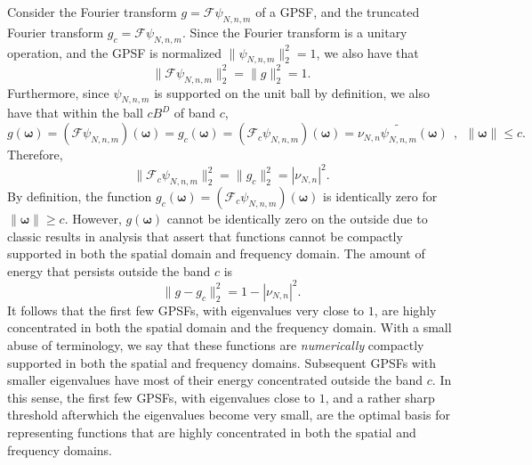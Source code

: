 \documentclass[12pt]{article}
\begin{document}
Consider the Fourier transform $g = \mathcal{F} \psi_{N,n,m}$ of a GPSF,
and the truncated Fourier transform $g_c = \mathcal{F} \psi_{N,n,m}$.
Since the Fourier transform is a unitary operation, and the GPSF is normalized $\|\psi_{N,n,m}\|_2^2=1$,
we also have that 
\begin{equation}
\| \mathcal{F} \psi_{N,n,m} \|_2^2 = \|g\|_2^2=1. 
\end{equation}
Furthermore, since $\psi_{N,n,m}$ is supported on the unit ball by definition, we also have that within the ball $cB^D$ of band $c$, 
\begin{equation}
g({\bm \omega}) = \left( \mathcal{F} \psi_{N,n,m}\right)({\bm \omega}) =  g_c({\bm \omega}) = \left( \mathcal{F}_c \psi_{N,n,m}\right)({\bm \omega}) = \nu_{N,n} \widetilde{\psi_{N,n,m}}({\bm \omega}) ~~,~~ \|{\bm \omega}\| \leq c.
\end{equation}
Therefore, 
\begin{equation}
\| \mathcal{F}_c \psi_{N,n,m} \|_2^2 = \|g_c\|_2^2= |\nu_{N,n}|^2. 
\end{equation}
By definition, the function $g_c({\bm \omega}) = \left(\mathcal{F}_c \psi_{N,n,m}\right)({\bm \omega})$ is identically zero for $\|{\bm \omega}\| \geq c$. 
However, $g({\bm \omega})$ cannot be identically zero on the outside due to classic results in analysis that assert that functions cannot be compactly supported in both the spatial domain and frequency domain. The amount of energy that persists outside the band $c$ is
\begin{equation}
 \| g-g_c \|_2^2 = 1-|\nu_{N,n}|^2.
\end{equation}
It follows that the first few GPSFs, with eigenvalues very close to $1$, are highly concentrated in both the spatial domain 
and the frequency domain. With a small abuse of terminology, we say that these functions are {\em numerically} compactly supported in both the spatial and frequency domains. Subsequent GPSFs with smaller eigenvalues have most of their energy concentrated outside the band $c$. In this sense, the first few GPSFs, with eigenvalues close to $1$, and a rather sharp threshold afterwhich the eigenvalues become very small, are the optimal basis for representing functions that are highly concentrated in both the spatial and frequency domains. 




%
% 
%
%
%
\end{document}
